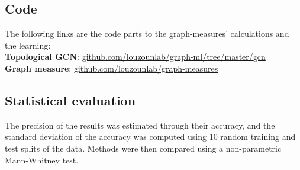 \subsection*{Code}
The following links are the code parts to the graph-measures’ calculations and the learning:
\\ \textbf{Topological GCN}:	\url{github.com/louzounlab/graph-ml/tree/master/gcn}
\\ \textbf{Graph measure}: 	\url{github.com/louzounlab/graph-measures}

\subsection*{Statistical evaluation}
The precision of the results was estimated through their accuracy, and the standard deviation of the accuracy was computed using 10 random training and test splits of the data. Methods were then compared using a non-parametric Mann-Whitney test.